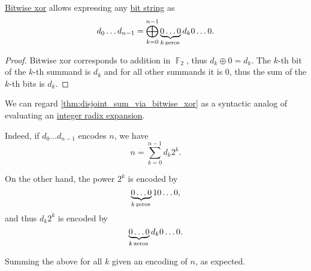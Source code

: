 \begin{proposition}\label{thm:disjoint_sum_via_bitwise_xor}
  \hyperref[def:bitwise_operations]{Bitwise xor} allows expressing any \hyperref[def:bit_string]{bit string} as
  \begin{equation*}
    d_0 \ldots d_{n-1} = \bigoplus_{k=0}^{n-1} \underbrace{0 \ldots 0}_{k \T*{zeros}} d_k 0 \ldots 0.
  \end{equation*}
\end{proposition}
\begin{proof}
  Bitwise xor corresponds to addition in \( \BbbF_2 \), thus \( d_k \oplus 0 = d_k \). The \( k \)-th bit of the \( k \)-th summand is \( d_k \) and for all other summands it is \( 0 \), thus the sum of the \( k \)-th bits is \( d_k \).
\end{proof}

\begin{example}\label{ex:thm:disjoint_sum_via_bitwise_xor}
  We can regard \cref{thm:disjoint_sum_via_bitwise_xor} as a syntactic analog of evaluating an \hyperref[def:integer_radix_expansion]{integer radix expansion}.

  Indeed, if \( d_0 \ldots d_{n-1} \) encodes \( n \), we have
  \begin{equation*}
    n = \sum_{k=0}^{n-1} d_k 2^k.
  \end{equation*}

  On the other hand, the power \( 2^k \) is encoded by
  \begin{equation*}
    \underbrace{0 \ldots 0}_{k \T*{zeros}} 1 0 \ldots 0,
  \end{equation*}
  and thus \( d_k 2^k \) is encoded by
  \begin{equation*}
    \underbrace{0 \ldots 0}_{k \T*{zeros}} d_k 0 \ldots 0.
  \end{equation*}

  Summing the above for all \( k \) given an encoding of \( n \), as expected.
\end{example}
